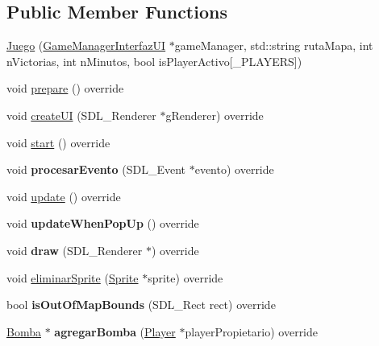 \subsection*{Public Member Functions}
\begin{DoxyCompactItemize}
\item 
\hyperlink{class_juego_aa3d9f9a9d5aa784f583d5f65b304d9e2}{Juego} (\hyperlink{class_game_manager_interfaz_u_i}{Game\+Manager\+Interfaz\+UI} $\ast$game\+Manager, std\+::string ruta\+Mapa, int n\+Victorias, int n\+Minutos, bool is\+Player\+Activo\mbox{[}\+\_\+\+P\+L\+A\+Y\+E\+RS\mbox{]})
\item 
void \hyperlink{class_juego_a5db4a2c61a5853c6a02341d0b9e77cbb}{prepare} () override
\item 
void \hyperlink{class_juego_a8dd19e6a53b446292e3e15e5e164ed05}{create\+UI} (S\+D\+L\+\_\+\+Renderer $\ast$g\+Renderer) override
\item 
void \hyperlink{class_juego_a83e5a1132a5355c34c31d219b4d035dc}{start} () override
\item 
void {\bfseries procesar\+Evento} (S\+D\+L\+\_\+\+Event $\ast$evento) override\hypertarget{class_juego_a67ecc26b162fcdad6471884a0e55f0a0}{}\label{class_juego_a67ecc26b162fcdad6471884a0e55f0a0}

\item 
void \hyperlink{class_juego_a74a8689a0513f13a8dfa6729bae77ada}{update} () override
\item 
void {\bfseries update\+When\+Pop\+Up} () override\hypertarget{class_juego_a6bb98ea5de6c8b4843afd5cd6a811e07}{}\label{class_juego_a6bb98ea5de6c8b4843afd5cd6a811e07}

\item 
void {\bfseries draw} (S\+D\+L\+\_\+\+Renderer $\ast$) override\hypertarget{class_juego_afd62461e81bfd0dcbeecf082f2c023ec}{}\label{class_juego_afd62461e81bfd0dcbeecf082f2c023ec}

\item 
void \hyperlink{class_juego_acaae61b971f3c2b767925db38da41d5c}{eliminar\+Sprite} (\hyperlink{class_sprite}{Sprite} $\ast$sprite) override
\item 
bool {\bfseries is\+Out\+Of\+Map\+Bounds} (S\+D\+L\+\_\+\+Rect rect) override\hypertarget{class_juego_a6d78e56d14ec9985037d213da9c134ff}{}\label{class_juego_a6d78e56d14ec9985037d213da9c134ff}

\item 
\hyperlink{class_bomba}{Bomba} $\ast$ {\bfseries agregar\+Bomba} (\hyperlink{class_player}{Player} $\ast$player\+Propietario) override\hypertarget{class_juego_a7b85a67ebed60f1e80e314f2298951a8}{}\label{class_juego_a7b85a67ebed60f1e80e314f2298951a8}


\end{DoxyCompactItemize}
